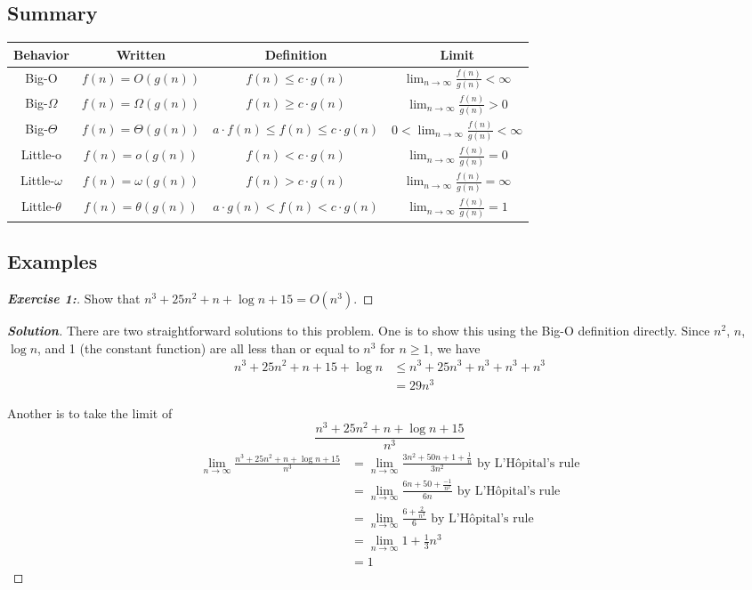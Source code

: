 \documentclass[a4paper]{article}
\newenvironment{solution}{\begin{proof}[\textnormal{\textbf{Solution}}]}{\end{proof}}
\newenvironment{exercise}[1]{\begin{proof}[\textnormal{\textbf{Exercise #1:}}]\phantom{\qedhere}}{\end{proof}}
\theoremstyle{definition}
\begin{document}
 \subsection{Summary}
 \begin{tabular}{|c|c|c|c|}\hline
  Behavior & Written & Definition & Limit\\\hline
  Big-O & $f(n)=O(g(n))$ & $f(n)\leq c\cdot g(n)$ & $\displaystyle\lim_{n\to\infty}\frac{f(n)}{g(n)}<\infty$\\\hline
  Big-$\Omega$ & $f(n)=\Omega(g(n))$ & $f(n)\geq c\cdot g(n)$ & $\displaystyle\lim_{n\to\infty}\frac{f(n)}{g(n)}>0$\\\hline
  Big-$\Theta$ & $f(n)=\Theta(g(n))$ & $a\cdot f(n) \leq f(n)\leq c\cdot g(n)$ & $0<\displaystyle\lim_{n\to\infty}\frac{f(n)}{g(n)}<\infty$\\\hline
  Little-o & $f(n)=o(g(n))$ & $f(n)< c\cdot g(n)$ & $\displaystyle\lim_{n\to\infty}\frac{f(n)}{g(n)}=0$\\\hline
  Little-$\omega$ & $f(n)=\omega(g(n))$ & $f(n)> c\cdot g(n)$ & $\displaystyle\lim_{n\to\infty}\frac{f(n)}{g(n)}=\infty$\\\hline
  Little-$\theta$ & $f(n)=\theta(g(n))$ & $a\cdot g(n) < f(n) < c\cdot g(n)$ & $\displaystyle\lim_{n\to\infty}\frac{f(n)}{g(n)}=1$\\\hline
 \end{tabular}

 \subsection{Examples}
 \begin{exercise}{1}
  Show that $n^3+25n^2+n+\log{n}+15=O(n^3)$.
 \end{exercise}
 
 \begin{solution}
  There are two straightforward solutions to this problem. One is to show this using the Big-O definition directly. Since $n^2$, $n$, $\log{n}$, and 1 (the constant function) are all less than or equal to $n^3$ for $n\geq1$, we have 
  \begin{align*}
   n^3+25n^2+n+15+\log{n}&\leq n^3+25n^3+n^3+n^3+n^3\\&=29n^3
  \end{align*}

  Another is to take the limit of \[\frac{n^3+25n^2+n+\log{n}+15}{n^3}\]
  \begin{align*}
   \lim_{n\to\infty}\frac{n^3+25n^2+n+\log{n}+15}{n^3}
 &=\lim_{n\to\infty}\frac{3n^2+50n+1+\frac{1}{n}}{3n^2}\text{ by L'H\^{o}pital's rule}\\
 &=\lim_{n\to\infty}\frac{6n+50+\frac{-1}{n^2}}{6n}\text{ by L'H\^{o}pital's rule}\\
 &=\lim_{n\to\infty}\frac{6+\frac{2}{n^3}}{6}\text{ by L'H\^{o}pital's rule}\\
 &=\lim_{n\to\infty}1+\frac{1}{3}n^3\\
 &=1
  \end{align*}

 \end{solution}
\end{document}
